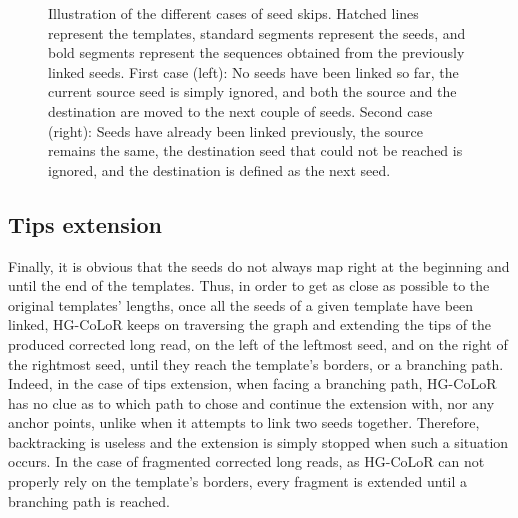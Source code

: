 \documentclass[long, final]{jobim2017}
\begin{document}
\begin{figure}
\begin{center}
{
	}
\end{center}
\caption{Illustration of the different cases of seed skips. Hatched lines represent the templates, standard segments represent
the seeds, and bold segments represent the sequences obtained from the previously linked seeds. First case (left): No seeds have been linked so far, the current source seed is simply ignored, and both the source and the destination are moved to the next couple of seeds. Second case (right): Seeds have already been linked previously, the source remains the same, the destination seed that could not be reached is ignored, and the destination is defined as the next seed. \label{SeedSkipping}}
\end{figure}

\subsection{Tips extension}

Finally, it is obvious that the seeds do not always map right at the beginning and until the end of the templates. Thus, in order to get as close as possible to the original templates' lengths, once all the seeds of a given template have been linked, HG-CoLoR keeps on traversing the graph and extending the tips of the produced corrected long read, on the left of the leftmost seed, and on the right of the rightmost seed, until they reach the template's borders, or a branching path. Indeed, in the case of tips extension, when facing a branching path, HG-CoLoR has no clue as to which path to chose and continue the extension with, nor any anchor points, unlike when it attempts to link two seeds together. Therefore, backtracking is useless and the extension is simply stopped when such a situation occurs. In the case of fragmented corrected long reads, as HG-CoLoR can not properly rely on the template's borders, every fragment is extended until a branching path is reached.
\end{document}

